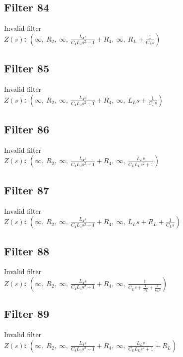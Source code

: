 \documentclass{article}
\begin{document}
\subsection*{Filter 84}
Invalid filter \\ 
\textbf{$Z(s)$:} $\left( \infty, \  R_{2}, \  \infty, \  \frac{L_{4} s}{C_{4} L_{4} s^{2} + 1} + R_{4}, \  \infty, \  R_{L} + \frac{1}{C_{L} s}\right)$ \\ 
\subsection*{Filter 85}
Invalid filter \\ 
\textbf{$Z(s)$:} $\left( \infty, \  R_{2}, \  \infty, \  \frac{L_{4} s}{C_{4} L_{4} s^{2} + 1} + R_{4}, \  \infty, \  L_{L} s + \frac{1}{C_{L} s}\right)$ \\ 
\subsection*{Filter 86}
Invalid filter \\ 
\textbf{$Z(s)$:} $\left( \infty, \  R_{2}, \  \infty, \  \frac{L_{4} s}{C_{4} L_{4} s^{2} + 1} + R_{4}, \  \infty, \  \frac{L_{L} s}{C_{L} L_{L} s^{2} + 1}\right)$ \\ 
\subsection*{Filter 87}
Invalid filter \\ 
\textbf{$Z(s)$:} $\left( \infty, \  R_{2}, \  \infty, \  \frac{L_{4} s}{C_{4} L_{4} s^{2} + 1} + R_{4}, \  \infty, \  L_{L} s + R_{L} + \frac{1}{C_{L} s}\right)$ \\ 
\subsection*{Filter 88}
Invalid filter \\ 
\textbf{$Z(s)$:} $\left( \infty, \  R_{2}, \  \infty, \  \frac{L_{4} s}{C_{4} L_{4} s^{2} + 1} + R_{4}, \  \infty, \  \frac{1}{C_{L} s + \frac{1}{R_{L}} + \frac{1}{L_{L} s}}\right)$ \\ 
\subsection*{Filter 89}
Invalid filter \\ 
\textbf{$Z(s)$:} $\left( \infty, \  R_{2}, \  \infty, \  \frac{L_{4} s}{C_{4} L_{4} s^{2} + 1} + R_{4}, \  \infty, \  \frac{L_{L} s}{C_{L} L_{L} s^{2} + 1} + R_{L}\right)$ \\ 
\end{document}
